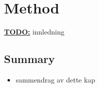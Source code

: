 \chapter{Method}
\label{chapter:method}

\textbf{\underline{\LARGE TODO:}} innledning






\section{Summary}
\label{sect:method:summary}
\begin{itemize}
  \item sammendrag av dette kap
\end{itemize}